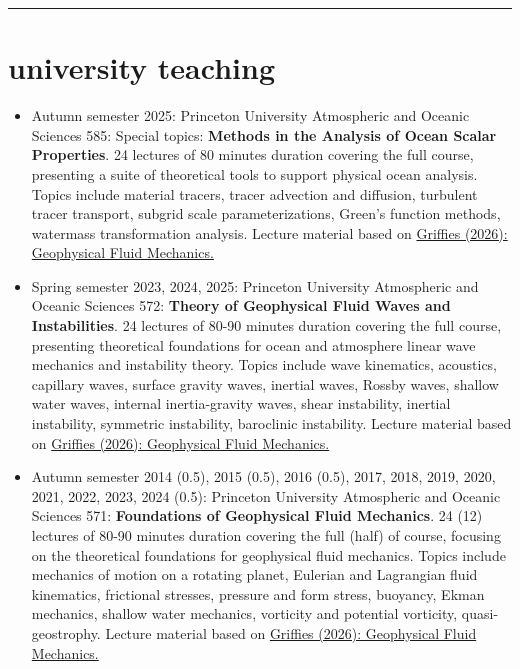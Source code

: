 \documentclass{article}
\begin{document}
\noindent\rule{\textwidth}{1pt}
\vspace{-1cm}
\section*{\sc  \color{Maroon}  university teaching}
\vspace{-.3cm}

\begin{itemize}[leftmargin=*]

\item Autumn semester 2025: Princeton University Atmospheric and Oceanic Sciences 585: Special topics: {\bf Methods in the Analysis of Ocean Scalar Properties}. 24 lectures of 80 minutes duration covering the full course, presenting a suite of theoretical tools to support physical ocean analysis. Topics include material tracers, tracer advection and diffusion, turbulent tracer transport, subgrid scale parameterizations, Green's function methods, watermass transformation analysis. Lecture material based on \href{https://stephengriffies.github.io/assets/pdfs/GFM_lectures.pdf}{Griffies (2026): Geophysical Fluid Mechanics.}

\item Spring semester 2023, 2024, 2025: Princeton University Atmospheric and Oceanic Sciences 572: {\bf Theory of Geophysical Fluid Waves and Instabilities}. 24 lectures of 80-90 minutes duration covering the full course, presenting theoretical foundations for ocean and atmosphere linear wave mechanics and instability theory. Topics include wave kinematics, acoustics, capillary waves, surface gravity waves, inertial waves, Rossby waves, shallow water waves, internal inertia-gravity waves, shear instability, inertial instability, symmetric instability, baroclinic instability. Lecture material based on \href{https://stephengriffies.github.io/assets/pdfs/GFM_lectures.pdf}{Griffies (2026): Geophysical Fluid Mechanics.}

\item Autumn semester 2014 (0.5), 2015 (0.5), 2016 (0.5), 2017, 2018, 2019, 2020, 2021, 2022, 2023, 2024 (0.5): Princeton University Atmospheric and Oceanic Sciences 571: {\bf  Foundations of Geophysical Fluid Mechanics}. 24 (12) lectures of 80-90 minutes duration covering the full (half) of course, focusing on the theoretical foundations for geophysical fluid mechanics. Topics include mechanics of motion on a rotating planet, Eulerian and Lagrangian fluid kinematics, frictional stresses, pressure and form stress, buoyancy, Ekman mechanics, shallow water mechanics, vorticity and potential vorticity, quasi-geostrophy. Lecture material based on \href{https://stephengriffies.github.io/assets/pdfs/GFM_lectures.pdf}{Griffies (2026): Geophysical Fluid Mechanics.}


\end{itemize}
\end{document}
